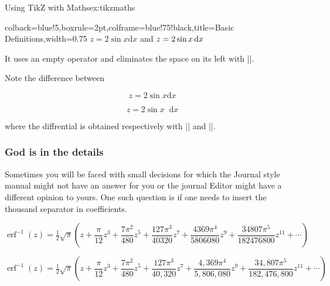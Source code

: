 {\begin{texexample}{Using TikZ with Maths}{ex:tikzmaths}
{
}
  
\end{texexample}



\begin{tcblisting}{colback=blue!5,boxrule=2pt,colframe=blue!75!black,title=Basic Definitions,width=0.75\textwidth}
\newcommand{\ud}{\ensuremath \mathop{}\!\mathrm{d}}
\(z=2\sin x\mathrm{d}x\) and \(z=2\sin x\ud x\)
\end{tcblisting}
\newcommand{\ud}{\mathop{}\!\mathrm{d}}
\bigskip

It uses an empty operator and eliminates the space
on its left with |\!|.

Note the difference between

\[z=2\sin x\mathrm{d}x  \]

\[z=2\sin x\ud x\]

where the diffrential is obtained respectively with
|| and |\ud|.




\subsubsection{God is in the details}

Sometimes you will be faced with small decisions for which the Journal style manual might not have an answer for you or the journal Editor might have a different opinion to yours. One such question is if one needs to insert the thousand separator in coefficients.

\[
\operatorname{erf}^{-1}(z)=\tfrac{1}{2}\sqrt{\pi}\left (z+\frac{\pi}{12}z^3+\frac{7\pi^2}{480}z^5+\frac{127\pi^3}{40320}z^7+\frac{4369\pi^4}{5806080}z^9+\frac{34807\pi^5}{182476800}z^{11}+\cdots\right )
\]


\[
\operatorname{erf}^{-1}(z)=\tfrac{1}{2}\sqrt{\pi}\left (z+\frac{\pi}{12}z^3+\frac{7\pi^2}{480}z^5+\frac{127\pi^3}{40,320}z^7+\frac{4,369\pi^4}{5,806,080}z^9+\frac{34,807\pi^5}{182,476,800}z^{11}+\cdots\right )
\]

}
